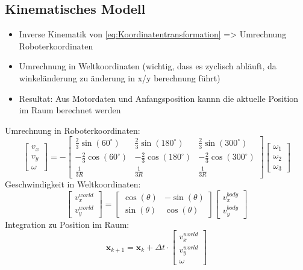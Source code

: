 \subsection{Kinematisches Modell}
\begin{itemize}
    \item Inverse Kinematik von \ref{eq:Koordinatentransformation} => Umrechnung Roboterkoordinaten
    \item Umrechnung in Weltkoordinaten (wichtig, dass es zyclisch abläuft, da winkeländerung zu änderung in x/y berechnung führt)
    \item Resultat: Aus Motordaten und Anfangsposition kannn die aktuelle Position im Raum berechnet werden
\end{itemize}
Umrechnung in Roboterkoordinaten:
\begin{equation}
    \begin{bmatrix}
        v_x \\
        v_y \\
        \omega
    \end{bmatrix}
    =
    -
    \begin{bmatrix}
        \frac{2}{3}\sin(60^\circ) & \frac{2}{3}\sin(180^\circ) & \frac{2}{3}\sin(300^\circ) \\
        -\frac{2}{3}\cos(60^\circ) & -\frac{2}{3}\cos(180^\circ) & -\frac{2}{3}\cos(300^\circ) \\
        \frac{1}{3R} & \frac{1}{3R} & \frac{1}{3R}
    \end{bmatrix}
    \begin{bmatrix}
        \omega_1 \\
        \omega_2 \\
        \omega_3
    \end{bmatrix}
\end{equation}
Geschwindigkeit in Weltkoordinaten:
\begin{equation}
    \begin{bmatrix}
        v_x^{world} \\
        v_y^{world}
    \end{bmatrix}
    =
    \begin{bmatrix}
        \cos(\theta) & -\sin(\theta) \\
        \sin(\theta) & \cos(\theta)
    \end{bmatrix}
    \begin{bmatrix}
        v_x^{body} \\
        v_y^{body}
    \end{bmatrix}
\end{equation}
Integration zu Position im Raum:
\begin{equation}
    \mathbf{x}_{k+1} =
    \mathbf{x}_k +
    \Delta t \cdot
    \begin{bmatrix}
        v_x^{world} \\
        v_y^{world} \\
        \omega
    \end{bmatrix}
\end{equation}

